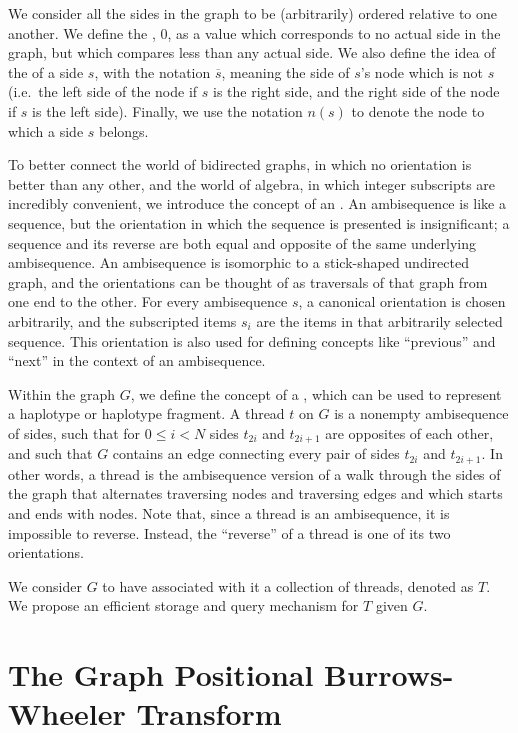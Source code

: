 We consider all the sides in the graph to be (arbitrarily) ordered relative to one another. We define the , $0$, as a value which corresponds to no actual side in the graph, but which compares less than any actual side. We also define the idea of the  of a side $s$, with the notation $\overline{s}$, meaning the side of $s$'s node which is not $s$ (i.e.\ the left side of the node if $s$ is the right side, and the right side of the node if $s$ is the left side). Finally, we use the notation $n(s)$ to denote the node to which a side $s$ belongs.

To better connect the world of bidirected graphs, in which no orientation is better than any other, and the world of algebra, in which integer subscripts are incredibly convenient, we introduce the concept of an . An ambisequence is like a sequence, but the orientation in which the sequence is presented is insignificant; a sequence and its reverse are both equal and opposite  of the same underlying ambisequence. An ambisequence is isomorphic to a stick-shaped undirected graph, and the orientations can be thought of as traversals of that graph from one end to the other. For every ambisequence $s$, a canonical orientation is chosen arbitrarily, and the subscripted items $s_{i}$ are the items in that arbitrarily selected sequence. This orientation is also used for defining concepts like ``previous'' and ``next'' in the context of an ambisequence.

Within the graph $G$, we define the concept of a , which can be used to represent a haplotype or haplotype fragment. A thread $t$ on $G$ is a nonempty ambisequence of sides, such that for $0 \leq i < N$ sides $t_{2i}$ and $t_{2i+1}$ are opposites of each other, and such that $G$ contains an edge connecting every pair of sides $t_{2i}$ and $t_{2i+1}$. In other words, a thread is the ambisequence version of a walk through the sides of the graph that alternates traversing nodes and traversing edges and which starts and ends with nodes. Note that, since a thread is an ambisequence, it is impossible to reverse. Instead, the ``reverse'' of a thread is one of its two orientations.

We consider $G$ to have associated with it a collection of  threads, denoted as $T$. We propose an efficient storage and query mechanism for $T$ given $G$.

\section*{The Graph Positional Burrows-Wheeler Transform}

